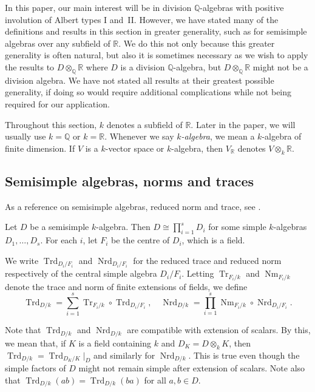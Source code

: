 \documentclass[JEP,XML,SOM,Unicode,NoFloatCountersInSection]{cedram}
\newcommand{\bQ}{\mathbb{Q}}
\newcommand{\bR}{\mathbb{R}}
\DeclareMathOperator{\Nm}{Nm}
\DeclareMathOperator{\Nrd}{Nrd}
\DeclareMathOperator{\Tr}{Tr}
\DeclareMathOperator{\Trd}{Trd}
\newcommand{\defterm}[1]{\emph{#1}}
\begin{document}
In this paper, our main interest will be in division $\bQ$-algebras with positive involution of Albert types I and~II.
However, we have stated many of the definitions and results in this section in greater generality, such as for semisimple algebras over any subfield of $\bR$.
We do this not only because this greater generality is often natural, but also it is sometimes necessary as we wish to apply the results to $D \otimes_\bQ \bR$ where $D$ is a division $\bQ$-algebra, but $D \otimes_\bQ \bR$ might not be a division algebra.
We have not stated all results at their greatest possible generality, if doing so would require additional complications while not being required for our application.

Throughout this section, $k$ denotes a subfield of $\bR$.
Later in the paper, we will usually use $k = \bQ$ or $k = \bR$.
Whenever we say \defterm{$k$-algebra}, we mean a $k$-algebra of finite dimension.
If $V$ is a $k$-vector space or $k$-algebra, then $V_\bR$ denotes $V \otimes_k \bR$.

\subsection{Semisimple algebras, norms and traces} \label{subsec:semisimple-algebras}

As a reference on semisimple algebras, reduced norm and trace, see \cite[\S9]{Rei75}.

Let $D$ be a semisimple $k$-algebra.
Then $D \cong \prod_{i=1}^s D_i$ for some simple $k$-algebras $D_1, \dotsc, D_s$.
For each $i$, let $F_i$ be the centre of $D_i$, which is a field.

We write $\Trd_{D_i/F_i}$ and $\Nrd_{D_i/F_i}$ for the reduced trace and reduced norm respectively of the central simple algebra $D_i/F_i$.
Letting $\Tr_{F_i/k}$ and $\Nm_{F_i/k}$ denote the trace and norm of finite extensions of fields, we define\vspace*{-3pt}
\[
\Trd_{D/k} = \sum_{i=1}^s \Tr_{F_i/k} \circ \Trd_{D_i/F_i}, \quad \Nrd_{D/k} = \prod_{i=1}^s \Nm_{F_i/k} \circ \Nrd_{D_i/F_i}.
\]

Note that $\Trd_{D/k}$ and $\Nrd_{D/k}$ are compatible with extension of scalars.
By this, we mean that, if $K$ is a field containing $k$ and $D_K = D \otimes_k K$, then $\Trd_{D/k} = \Trd_{D_K/K}|_D$ and similarly for $\Nrd_{D/k}$.
This is true even though the simple factors of $D$ might not remain simple after extension of scalars.
Note also that $\Trd_{D/k}(ab) = \Trd_{D/k}(ba)$ for all $a, b \in D$.
\end{document}
